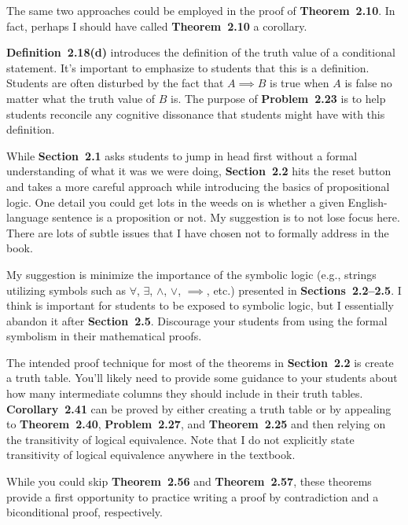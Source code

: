 \documentclass[11pt]{article}%
\newcommand{\blankline}{\pagebreak[2]\vspace{.5\baselineskip}}
\begin{document}
\blankline

The same two approaches could be employed in the proof of \textbf{Theorem~2.10}.  In fact, perhaps I should have called \textbf{Theorem~2.10} a corollary.

\blankline

\textbf{Definition~2.18(d)} introduces the definition of the truth value of a conditional statement.  It's important to emphasize to students that this is a definition.  Students are often disturbed by the fact that $A \implies B$ is true when $A$ is false no matter what the truth value of $B$ is.  The purpose of \textbf{Problem~2.23} is to help students reconcile any cognitive dissonance that students might have with this definition.

\blankline

While \textbf{Section~2.1} asks students to jump in head first without a formal understanding of what it was we were doing, \textbf{Section~2.2} hits the reset button and takes a more careful approach while introducing the basics of propositional logic.  One detail you could get lots in the weeds on is whether a given English-language sentence is a proposition or not.  My suggestion is to not lose focus here.  There are lots of subtle issues that I have chosen not to formally address in the book. 

\blankline

My suggestion is minimize the importance of the symbolic logic (e.g., strings utilizing symbols such as $\forall$, $\exists$, $\wedge$, $\vee$, $\implies$, etc.) presented in \textbf{Sections~2.2--2.5}.  I think is important for students to be exposed to symbolic logic, but I essentially abandon it after \textbf{Section~2.5}.  Discourage your students from using the formal symbolism in their mathematical proofs.

\blankline

The intended proof technique for most of the theorems in \textbf{Section~2.2} is create a truth table.  You'll likely need to provide some guidance to your students about how many intermediate columns they should include in their truth tables.  \textbf{Corollary~2.41} can be proved by either creating a truth table or by appealing to \textbf{Theorem~2.40}, \textbf{Problem~2.27}, and \textbf{Theorem~2.25} and then relying on the transitivity of logical equivalence. Note that I do not explicitly state transitivity of logical equivalence anywhere in the textbook.

\blankline

While you could skip \textbf{Theorem~2.56} and \textbf{Theorem~2.57}, these theorems provide a first opportunity to practice writing a proof by contradiction and a biconditional proof, respectively.
\end{document}
